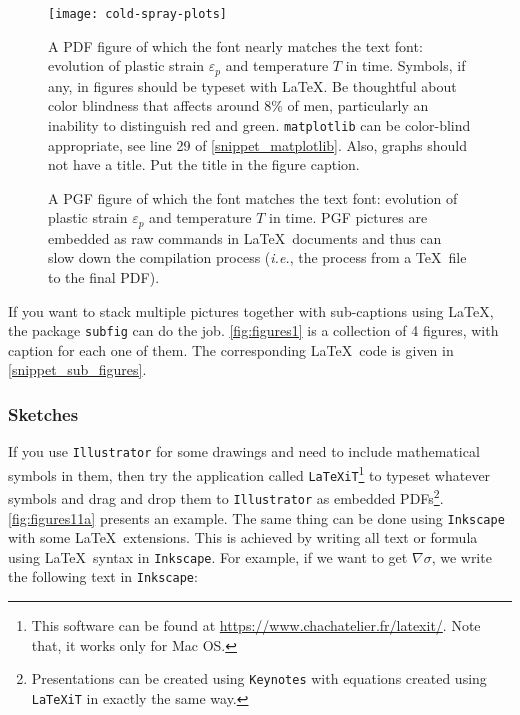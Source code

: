 \documentclass[authoryear,12pta4paper,fleqn]{article}
\newcommand{\ie}{\textit{i.e.},\xspace}
\numberwithin{equation}{section}
\theoremstyle{remark}
\begin{document}
\begin{figure}[!h]
  \centering
  \texttt{[image: cold-spray-plots]}
  \caption{A PDF figure of which the font nearly matches the text font: 
  evolution of plastic strain $\varepsilon_p$ and temperature $T$ in time. Symbols, if any, in figures should be typeset with \LaTeX.  Be thoughtful about color blindness that affects around 8\% of men, particularly an inability to distinguish red and green. \texttt{matplotlib} can be color-blind appropriate,  see line 29 of \cref{snippet_matplotlib}. Also, graphs should not have a title. Put the title in the figure caption.}
  \label{fig:cold-spray-plot}
\end{figure}

\begin{figure}[!h]
  \centering
  
  \caption{A PGF figure of which the font matches the text font: 
  evolution of plastic strain $\varepsilon_p$ and temperature  $T$ in time. PGF pictures are embedded as raw commands in \LaTeX\ documents and thus can slow down the compilation process (\ie the process from a \TeX\ file to the final PDF).}
  \label{fig:cold-spray-plot-pgf}
\end{figure}



If you want to stack multiple pictures together with sub-captions using \LaTeX, the package \texttt{subfig} can do the job. \cref{fig:figures1} is a collection of 4 figures, with caption for each one of them. The corresponding \LaTeX\ code is given in \cref{snippet_sub_figures}.

\subsubsection{Sketches}\label{sec:sketches}

If you use \texttt{Illustrator} for some drawings and need to include mathematical symbols in them, then try the application called \texttt{LaTeXiT}\footnote{This software can be found at \url{https://www.chachatelier.fr/latexit/}. Note that, it works only for Mac OS.} to typeset whatever symbols and drag and drop them to \texttt{Illustrator} as embedded PDFs\footnote{Presentations can be created using \texttt{Keynotes} with equations created using \texttt{LaTeXiT} in exactly the same way.}.  \cref{fig:figures11a} presents an example. The same thing can be done using \texttt{Inkscape} with some \LaTeX\ extensions. This is achieved by writing all text or formula using \LaTeX\ syntax in \texttt{Inkscape}. For example, if we want to get $\nabla \sigma$, we write the following text in  \texttt{Inkscape}:
\end{document}
